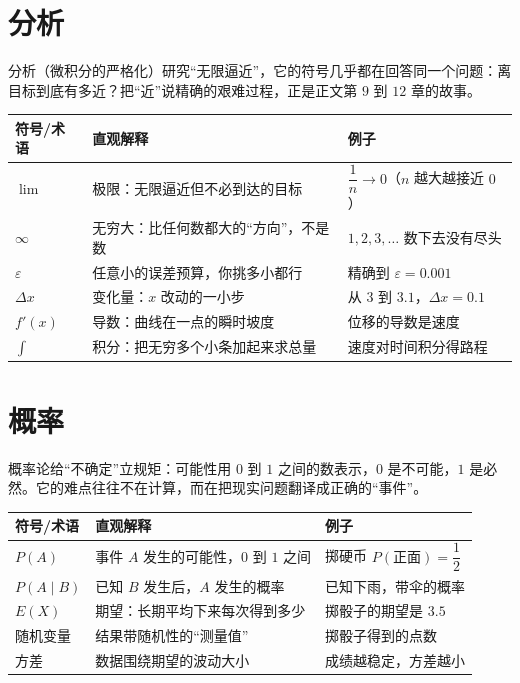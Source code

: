 \section{分析}

分析（微积分的严格化）研究“无限逼近”，它的符号几乎都在回答同一个问题：离目标到底有多近？把“近”说精确的艰难过程，正是正文第 $9$ 到 $12$ 章的故事。

\begin{center}
\begin{tabular}{lp{4.8cm}p{5.4cm}}
\toprule
符号/术语 & 直观解释 & 例子 \\
\midrule
$\lim$ & 极限：无限逼近但不必到达的目标 & $\dfrac{1}{n}\to 0$（$n$ 越大越接近 $0$） \\
$\infty$ & 无穷大：比任何数都大的“方向”，不是数 & $1,2,3,\dots$ 数下去没有尽头 \\
$\varepsilon$ & 任意小的误差预算，你挑多小都行 & 精确到 $\varepsilon=0.001$ \\
$\Delta x$ & 变化量：$x$ 改动的一小步 & 从 $3$ 到 $3.1$，$\Delta x=0.1$ \\
$f'(x)$ & 导数：曲线在一点的瞬时坡度 & 位移的导数是速度 \\
$\int$ & 积分：把无穷多个小条加起来求总量 & 速度对时间积分得路程 \\
\bottomrule
\end{tabular}
\end{center}

\section{概率}

概率论给“不确定”立规矩：可能性用 $0$ 到 $1$ 之间的数表示，$0$ 是不可能，$1$ 是必然。它的难点往往不在计算，而在把现实问题翻译成正确的“事件”。

\begin{center}
\begin{tabular}{lp{4.8cm}p{5.4cm}}
\toprule
符号/术语 & 直观解释 & 例子 \\
\midrule
$P(A)$ & 事件 $A$ 发生的可能性，$0$ 到 $1$ 之间 & 掷硬币 $P(\text{正面})=\dfrac{1}{2}$ \\
$P(A\mid B)$ & 已知 $B$ 发生后，$A$ 发生的概率 & 已知下雨，带伞的概率 \\
$E(X)$ & 期望：长期平均下来每次得到多少 & 掷骰子的期望是 $3.5$ \\
随机变量 & 结果带随机性的“测量值” & 掷骰子得到的点数 \\
方差 & 数据围绕期望的波动大小 & 成绩越稳定，方差越小 \\
\bottomrule
\end{tabular}
\end{center}


